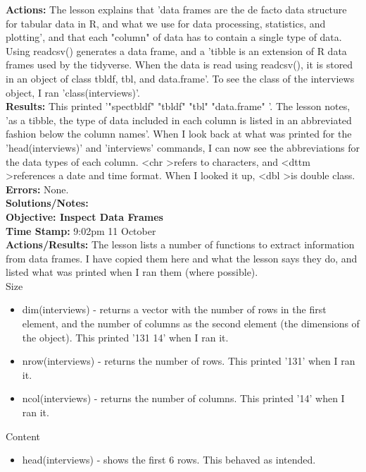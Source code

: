 \documentclass{article}
\begin{document}
\begin{FlushLeft}
\textbf{Actions:} The lesson explains that 'data frames are the de facto data structure for tabular data in R, and what we use for data processing, statistics, and plotting', and that each "column" of data has to contain a single type of data. Using read\textunderscore csv() generates a data frame, and a 'tibble  is an extension of R data frames used by the tidyverse. When the data is read using read\textunderscore csv(), it is stored in an object of class tbl\textunderscore df, tbl, and data.frame'. To see the class of the interviews object, I ran 'class(interviews)'.\\
\textbf{Results:} This printed '"spec\textunderscore tbl\textunderscore df" "tbl\textunderscore df" "tbl" "data.frame" '. The lesson notes, 'as a tibble, the type of data included in each column is listed in an abbreviated fashion below the column names'. When I look back at what was printed for the 'head(interviews)' and 'interviews' commands, I can now see the abbreviations for the data types of each column. \textless chr \textgreater refers to characters, and \textless dttm \textgreater references a date and time format. When I looked it up, \textless dbl \textgreater is double class.\\
\textbf{Errors:} None.\\
\textbf{Solutions/Notes:}\\
\vspace{5mm}
\textbf{Objective: Inspect Data Frames}\\ 
\textbf{Time Stamp:} 9:02pm 11 October\\
\textbf{Actions/Results:} The lesson lists a number of functions to extract information from data frames. I have copied them here and what the lesson says they do, and listed what was printed when I ran them (where possible).\\
Size
\begin{itemize}
    \item dim(interviews) - returns a vector with the number of rows in the first element, and the number of columns as the second element (the dimensions of the object). This printed '131 14' when I ran it.
    \item nrow(interviews) - returns the number of rows. This printed '131' when I ran it.
    \item ncol(interviews) - returns the number of columns. This printed '14' when I ran it.
\end{itemize}
Content
\begin{itemize}
    \item head(interviews) - shows the first 6 rows. This behaved as intended.

\end{itemize}
\end{FlushLeft}
\end{document}
